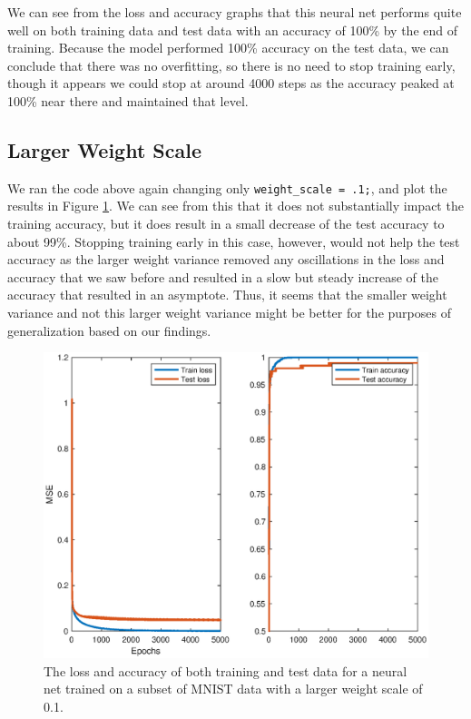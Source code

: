 \documentclass[11pt, oneside]{article}
\begin{document}
We can see from the loss and accuracy graphs that this neural net performs quite well on both training data and test data with an accuracy of 100\% by the end of training. Because the model performed 100\% accuracy on the test data, we can conclude that there was no overfitting, so there is no need to stop training early, though it appears we could stop at around 4000 steps as the accuracy peaked at 100\% near there and maintained that level.

\subsection{Larger Weight Scale}

We ran the code above again changing only \lstinline{weight_scale = .1;}, and plot the results in Figure \ref{fig:netMetrics2}. We can see from this that it does not substantially impact the training accuracy, but it does result in a small decrease of the test accuracy to about 99\%. Stopping training early in this case, however, would not help the test accuracy as the larger weight variance removed any oscillations in the loss and accuracy that we saw before and resulted in a slow but steady increase of the accuracy that resulted in an asymptote. Thus, it seems that the smaller weight variance and not this larger weight variance might be better for the purposes of generalization based on our findings. 

\begin{figure}[ht!]
\includegraphics[width=1\textwidth]{netMetrics2.eps}
\caption{The loss and accuracy of both training and test data for a neural net trained on a subset of MNIST data with a larger weight scale of 0.1.}
\label{fig:netMetrics2}
\end{figure}
\end{document}
